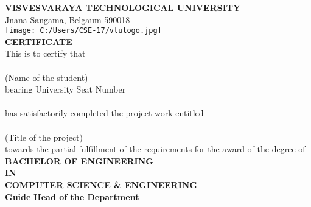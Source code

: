 \documentclass[12pt, a4paper]{report}
\begin{document}
\begin{titlepage}
\begin{center}
\textbf{{\large VISVESVARAYA TECHNOLOGICAL UNIVERSITY}}\\
{\normalsize Jnana Sangama, Belgaum-590018}\\
\vspace{0.5in}
\texttt{[image: C:/Users/CSE-17/vtulogo.jpg]}\\
\vspace{0.5in}
\textbf{CERTIFICATE}\\
\vspace{0.3in}
This is to certify that \\
\vspace{0.2in}
\underline{\hspace{10cm}}\\
\vspace{0.2in}
(Name of the student)\\
\vspace{0.2in}
bearing University Seat Number \\
\vspace{0.2in}
\underline{\hspace{10cm}}\\
\vspace{0.2in}
has satisfactorily completed the project work entitled \\
\vspace{0.2in}
\underline{\hspace{10cm}}\\
\vspace{0.2in}
(Title of the project)\\
\vspace{0.2in}
towards the partial fulfillment of the requirements for the award of the degree of\\
\vspace{0.2in}
\textbf{BACHELOR OF ENGINEERING\\IN\\COMPUTER SCIENCE \& ENGINEERING}\\
\vspace{0.5in}
\textbf{Guide} \hspace{3.5in} \textbf{Head of the Department}\\
\vspace{0.3in}
\underline{\hspace{6cm}} \hspace{1.5in} \underline{\hspace{6cm}}\\

\end{center}
\end{titlepage}
\end{document}
